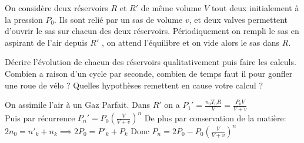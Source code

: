 \begin{Exercise}[title=Pompe]
		On considère deux réservoirs $R$ et $R'$ de même volume $V$ tout deux initialement à la pression $P_0$. Ils sont relié par un sas de volume $v$, et deux valves permettent d'ouvrir le sas sur chacun des deux réservoirs.
		Périodiquement on rempli le sas en aspirant de l'air depuis $R'$ , on attend l'équilibre et on vide alors le sas  dans $R$.

		\Question Décrire l'évolution de chacun des réservoirs qualitativement puis faire les calculs.
		\Question Combien a raison d'un cycle par seconde, combien de temps faut il pour gonfler une roue de vélo ? Quelles hypothèses remettent en cause votre calcul ?
\end{Exercise}
\begin{Answer}
  \Question On assimile l'air à un Gaz Parfait.
  Dans $R'$ on a $P_1'= \frac{n_0T_0R}{V} = \frac{P_0 V}{V+v}$\\
  Puis par récurrence $P_n'= P_0 \left(\frac{V}{V+v}\right)^n$
  De plus par conservation de la matière: $ 2n_0=n'_k+n_k \implies 2P_0=P'_k+P_k$
  Donc $P_n = 2P_0- P_0\left(\frac{V}{V+v}\right)^n$
\end{Answer}

